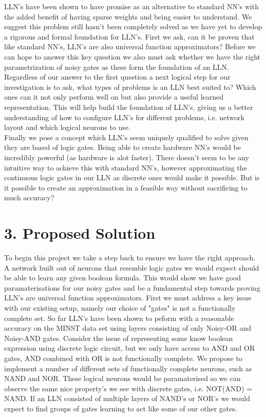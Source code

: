 \documentclass[11pt, a4paper, twoside, openright]{report}
\begin{document}
LLN's have been shown to have  promise as an alternative to standard NN's with the added benefit of having sparse weights and being easier to understand. We suggest this problem still hasn't been completely solved as we have yet to develop a rigorous and formal foundation for LLN's. First we ask, can it be proven that like standard NN's, LLN's are also universal function approximators?  Before we can hope to answer this key question we also must ask whether we have the right parametrization of noisy gates as these form the foundation of an LLN. \\

Regardless of our answer to the first question a next logical step for our investigation is to ask, what types of problems is an LLN best suited to? Which ones can it not only perform well on but also provide a useful learned representation. This will help build the foundation of LLN's, giving us a better understanding of how to configure LLN's for different problems, i.e. network layout and which logical neurons to use.\\

Finally we pose a concept which LLN's seem uniquely qualified to solve given they are based of logic gates. Being able to create hardware NN's would be incredibly powerful (as hardware is alot faster). There doesn't seem to be any intuitive way to achieve this with standard NN's, however approximating the continuous logic gates in our LLN as discrete ones would make it possible. But is it possible to create an approximation in a feasible way without sacrificing to much accuracy?

\section*{3. Proposed Solution}

To begin this project we take a step back to ensure we have the right approach. A network built out of neurons that resemble logic gates we would expect should be able to learn any given boolean formula. This would show we have good paramaterisations for our noisy gates and be a fundamental step towards proving LLN's are universal function approximators. First we must address a key issue with our existing setup, namely our choice of "gates" is not a functionally complete set. So far LLN's have been shown to peform with a reasonable accuracy on the MINST data set using layers consisting of only Noisy-OR and Noisy-AND gates. Consider the issue of representing some know boolean expression using discrete logic circuit, but we only have access to AND and OR gates, AND combined with OR is not functionally complete. We propose to implement a number of different sets of functionally complete neurons, such as NAND and NOR. These logical neurons would be paramaterised so we can observe the same nice property's we see with discrete gates, i.e. NOT(AND) = NAND. If an LLN consisted of multiple layers of NAND's or NOR's we would expect to find groups of gates learning to act like some of our other gates. \\
\end{document}
